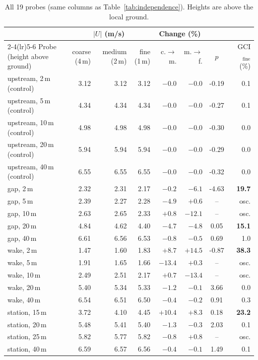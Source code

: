 \begin{table}[htbp]
\centering
\small
\caption{All 19 probes (same columns as Table~\ref{tab:independence}). Heights are above the local ground.}
\label{tab:allprobes}
\begin{tabular}{lrrrrrcr}
\toprule
 & \multicolumn{3}{c}{$|U|$ (m/s)} & \multicolumn{2}{c}{Change (\%)} & & \\
\cmidrule(lr){2-4}\cmidrule(lr){5-6}
Probe (height above ground) & coarse (4\,m) & medium (2\,m) & fine (1\,m) & c.$\to$m. & m.$\to$f. & $p$ & GCI$_\mathrm{fine}$ (\%) \\
\midrule
upstream, 2\,m (control) & 3.12 & 3.12 & 3.12 & $-0.0$ & $-0.0$ & -0.19 & 0.1 \\
upstream, 5\,m (control) & 4.34 & 4.34 & 4.34 & $-0.0$ & $-0.0$ & -0.27 & 0.1 \\
upstream, 10\,m (control) & 4.98 & 4.98 & 4.98 & $-0.0$ & $-0.0$ & -0.30 & 0.0 \\
upstream, 20\,m (control) & 5.94 & 5.94 & 5.94 & $-0.0$ & $-0.0$ & -0.29 & 0.0 \\
upstream, 40\,m (control) & 6.55 & 6.55 & 6.55 & $-0.0$ & $-0.0$ & -0.32 & 0.0 \\
\midrule
gap, 2\,m & 2.32 & 2.31 & 2.17 & $-0.2$ & $-6.1$ & -4.63 & \textbf{19.7} \\
gap, 5\,m & 2.39 & 2.27 & 2.28 & $-4.9$ & $+0.6$ & -- & osc. \\
gap, 10\,m & 2.63 & 2.65 & 2.33 & $+0.8$ & $-12.1$ & -- & osc. \\
gap, 20\,m & 4.84 & 4.62 & 4.40 & $-4.7$ & $-4.8$ & 0.05 & \textbf{15.1} \\
gap, 40\,m & 6.61 & 6.56 & 6.53 & $-0.8$ & $-0.5$ & 0.69 & 1.0 \\
\midrule
wake, 2\,m & 1.47 & 1.60 & 1.83 & $+8.7$ & $+14.5$ & -0.87 & \textbf{38.3} \\
wake, 5\,m & 1.91 & 1.65 & 1.66 & $-13.4$ & $+0.3$ & -- & osc. \\
wake, 10\,m & 2.49 & 2.51 & 2.17 & $+0.7$ & $-13.4$ & -- & osc. \\
wake, 20\,m & 5.40 & 5.34 & 5.33 & $-1.2$ & $-0.1$ & 3.66 & 0.0 \\
wake, 40\,m & 6.54 & 6.51 & 6.50 & $-0.4$ & $-0.2$ & 0.91 & 0.3 \\
\midrule
station, 15\,m & 3.72 & 4.10 & 4.45 & $+10.4$ & $+8.3$ & 0.18 & \textbf{23.2} \\
station, 20\,m & 5.48 & 5.41 & 5.40 & $-1.3$ & $-0.3$ & 2.03 & 0.1 \\
station, 25\,m & 5.82 & 5.77 & 5.82 & $-0.8$ & $+0.8$ & -- & osc. \\
station, 40\,m & 6.59 & 6.57 & 6.56 & $-0.4$ & $-0.1$ & 1.49 & 0.1 \\
\bottomrule
\end{tabular}
\end{table}
